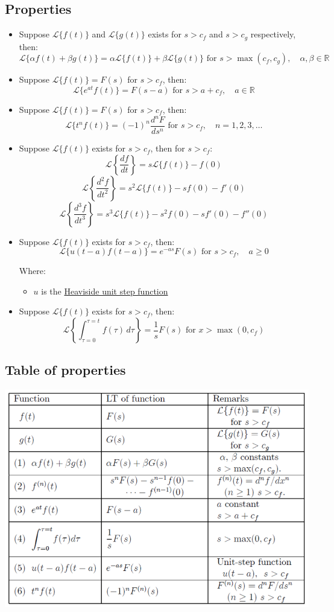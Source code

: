 \documentclass[11pt]{article}
\begin{document}
 \newpage
\subsection{Properties}
\label{sec:orge829bb2}
\begin{itemize}
\item Suppose \(\mathcal{L} \{ f(t) \}\) and \(\mathcal{L} \{ g(t) \}\) exists for \(s > c_f\) and \(s > c_g\) respectively, then:
\[\mathcal{L} \{ \alpha f(t) + \beta g(t) \} = \alpha \mathcal{L} \{ f(t) \} + \beta \mathcal{L} \{ g(t) \} \text{ for } s > \max (c_f, c_g), \quad \alpha, \beta \in \mathbb{R}\]

\item Suppose \(\mathcal{L} \{ f(t) \} = F(s)\) for \(s > c_f\), then:
\[\mathcal{L} \{ e^{at} f(t) \} = F(s - a) \text{ for } s > a + c_f, \quad a \in \mathbb{R}\]

\item Suppose \(\mathcal{L} \{ f(t) \} = F(s)\) for \(s > c_f\), then:
\[\mathcal{L} \{ t^n f(t) \} = (-1)^n \frac{d^n F}{ds^n} \text{ for } s > c_f, \quad n = 1, 2, 3, \ldots\]

\item Suppose \(\mathcal{L} \{ f(t) \}\) exists for \(s > c_f\), then for \(s > c_f\):
\[\mathcal{L} \left\{ \frac{df}{dt} \right\} = s \mathcal{L} \{ f(t) \} - f(0)\]
\[\mathcal{L} \left\{ \frac{d^2 f}{dt^2} \right\} = s^2 \mathcal{L} \{ f(t) \} - sf(0) - f'(0)\]
\[\mathcal{L} \left\{ \frac{d^3 f}{dt^3} \right\} = s^3 \mathcal{L} \{ f(t) \} - s^2f(0) - sf'(0) - f''(0)\]

\item Suppose \(\mathcal{L} \{ f(t) \}\) exists for \(s > c_f\), then:
\[\mathcal{L} \{ u(t - a) f(t - a) \} = e^{-as} F(s) \text{ for } s > c_f, \quad a \ge 0\]

Where:
\begin{itemize}
\item \(u\) is the \hyperref[orgfaf877c]{Heaviside unit step function}
\end{itemize}

\item Suppose \(\mathcal{L} \{ f(t) \}\) exists for \(s > c_f\), then:
\[\mathcal{L} \left\{ \int_{\tau = 0}^{\tau = t} f(\tau) \, d \tau \right\} = \frac{1}{s} F(s) \text{ for } x > \max (0, c_f)\]
\end{itemize}
\subsection{Table of properties}
\label{sec:orgc2e7ec5}
\begin{center}
\includegraphics[width=.9\linewidth]{./images/laplace-transform-properties.png}
\end{center}
\end{document}
